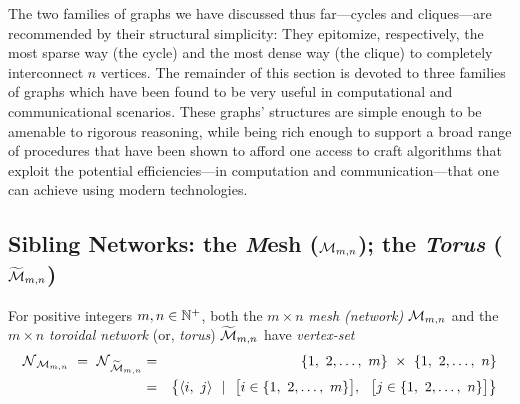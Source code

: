 \bigskip

The two families of graphs we have discussed thus far---cycles and cliques---are recommended by their structural simplicity:  They epitomize, respectively, the most sparse way (the cycle) and the most dense way (the clique) to completely interconnect $n$ vertices.  The remainder of this section is devoted to three families of graphs which have been found to be very useful in computational and communicational scenarios.  These graphs' structures are simple enough to be amenable to rigorous reasoning, while being rich enough to support a broad range of procedures that have been shown to afford one access to craft algorithms that exploit the potential efficiencies---in computation and communication---that one can achieve using modern technologies.

\subsection{Sibling Networks: the {\it M}esh ($\mbox{$\cal M$}_{m,n}$); the {\it Torus} ($\widetilde{\mbox{$\cal M$}}_{m,n}$)}
\label{sec:mesh}

For positive integers $m, n \in \mathbb{N}^+$, both the $m \times n$ {\it mesh (network)} $\mbox{$\cal M$}_{m,n}$ and the $m \times n$ {\it toroidal network} (or, {\it torus}) $\widetilde{\mbox{$\cal M$}}_{m,n}$ have {\it vertex-set}
\begin{eqnarray*}
\n_{\fm_{m,n}} \ = \ \n_{\widetilde{\fm}_{m,n}}
  & = & 
\{1, \ 2, \ldots, \ m\} \ \times \ \{1, \ 2, \ldots, \ n\} \\
  & = & 
\big\{ \langle i, \ j \rangle \ \ | \ \ 
\big[ i \in \{1, \ 2, \ldots, \ m\} \big], \ \ \big[ j \in \{1, \ 2, \ldots, \ n\} \big]
\big\}
\end{eqnarray*}

